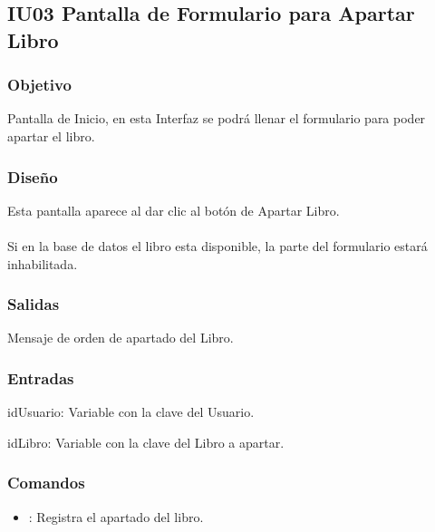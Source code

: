 \newpage
\subsection{IU03 Pantalla de Formulario para Apartar Libro}

\subsubsection{Objetivo}
	Pantalla de Inicio, en esta Interfaz se podrá llenar el formulario para poder apartar el libro.

\subsubsection{Diseño}
	Esta pantalla aparece al dar clic al botón de Apartar Libro.  \\\\
	Si en la base de datos el libro esta disponible, la parte del formulario estará inhabilitada. 


\subsubsection{Salidas}
	\begin{Citemize}
		\item Mensaje de orden de apartado del Libro.
	\end{Citemize}
	
\subsubsection{Entradas}
	\begin{Citemize}
		\item idUsuario: Variable con la clave del Usuario.
		\item idLibro: Variable con la clave del Libro a apartar.
	\end{Citemize}

\subsubsection{Comandos}
\begin{itemize}
	\item {}: Registra el apartado del libro.
\end{itemize}


